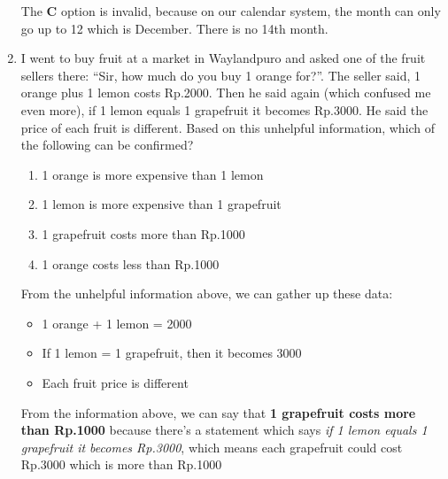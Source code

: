 \documentclass[12pt,titlepage]{article}
\begin{document}
\begin{enumerate}
{        The \textbf{C} option is invalid, because on our calendar system, the month can only go up to 12 which is December. 
        There is no 14th month.
    }
    \item {
        I went to buy fruit at a market in Waylandpuro and asked one of the fruit sellers there: “Sir, how much do you buy 1
        orange for?”. The seller said, 1 orange plus 1 lemon costs Rp.2000. Then he said again (which confused me even more), if
        1 lemon equals 1 grapefruit it becomes Rp.3000. He said the price of each fruit is different. Based on this unhelpful
        information, which of the following can be confirmed?
        \begin{enumerate}[label=\Alph*.]
            \item 1 orange is more expensive than 1 lemon
            \item 1 lemon is more expensive than 1 grapefruit
            \item 1 grapefruit costs more than Rp.1000
            \item 1 orange costs less than Rp.1000
        \end{enumerate}
        \pagebreak
        From the unhelpful information above, we can gather up these data:
        \begin{itemize}
            \item 1 orange + 1 lemon = 2000
            \item If 1 lemon = 1 grapefruit, then it becomes 3000
            \item Each fruit price is different
        \end{itemize}

        From the information above, we can say that \textbf{1 grapefruit costs more than Rp.1000} because there's a statement which says
        \textit{if 1 lemon equals 1 grapefruit it becomes Rp.3000}, which means each grapefruit could cost Rp.3000 which is more than Rp.1000
    }
\end{enumerate}
\end{document}
